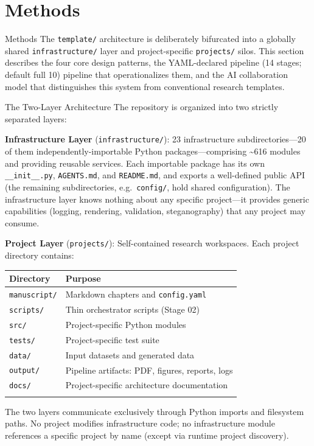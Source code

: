 \documentclass[
  ignorenonframetext,
]{beamer}
\author{\texorpdfstring{}{}}
\date{}
\newcounter{none} %
\begin{document}
\section{Methods}\label{methods}

\begin{frame}{Methods}
The \texttt{template/} architecture is deliberately bifurcated into a
globally shared \texttt{infrastructure/} layer and project-specific
\texttt{projects/} silos. This section describes the four core design
patterns, the YAML-declared pipeline (14 stages; default full 10)
pipeline that operationalizes them, and the AI collaboration model that
distinguishes this system from conventional research templates.
\end{frame}

\begin{frame}{The Two-Layer Architecture}
\protect{}\label{the-two-layer-architecture}
The repository is organized into two strictly separated layers:

\textbf{Infrastructure Layer} (\texttt{infrastructure/}): 23
infrastructure subdirectories---20 of them independently-importable
Python packages---comprising \textasciitilde616 modules and providing
reusable services. Each importable package has its own
\texttt{\_\_init\_\_.py}, \texttt{AGENTS.md}, and \texttt{README.md},
and exports a well-defined public API (the remaining subdirectories,
e.g.~\texttt{config/}, hold shared configuration). The infrastructure
layer knows nothing about any specific project---it provides generic
capabilities (logging, rendering, validation, steganography) that any
project may consume.

\textbf{Project Layer} (\texttt{projects/}): Self-contained research
workspaces. Each project directory contains:

{\def\LTcaptype{none} %
\begin{longtable}[]{@{}ll@{}}
\toprule\noalign{}
Directory & Purpose \\
\midrule\noalign{}
\endhead
\texttt{manuscript/} & Markdown chapters and \texttt{config.yaml} \\
\texttt{scripts/} & Thin orchestrator scripts (Stage 02) \\
\texttt{src/} & Project-specific Python modules \\
\texttt{tests/} & Project-specific test suite \\
\texttt{data/} & Input datasets and generated data \\
\texttt{output/} & Pipeline artifacts: PDF, figures, reports, logs \\
\texttt{docs/} & Project-specific architecture documentation \\
\bottomrule\noalign{}
\end{longtable}
}

The two layers communicate exclusively through Python imports and
filesystem paths. No project modifies infrastructure code; no
infrastructure module references a specific project by name (except via
runtime project discovery).
\end{frame}
\end{document}
